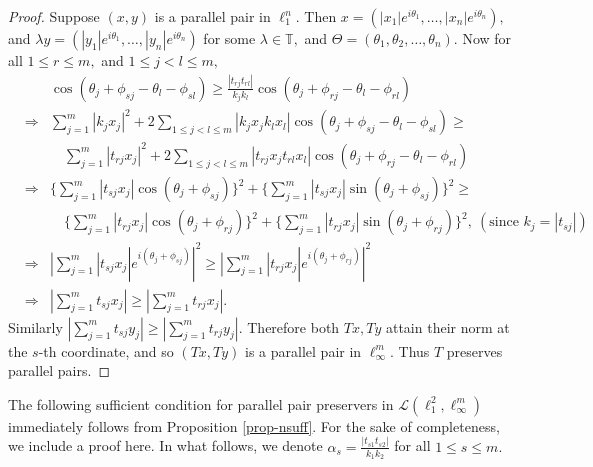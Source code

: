 \documentclass{amsart}
\theoremstyle{definition}
\newtheorem{cor}[theorem]{Corollary}
\theoremstyle{remark}
\numberwithin{equation}{section}
\begin{document}
\begin{proof}
	Suppose $(x,y)$ is a parallel pair in $\ell_1^n.$ Then $x=(|x_1|e^{i\theta_1},\ldots, |x_n|e^{i\theta_n}),$ and $\lambda y=(|y_1|e^{i\theta_1},\ldots, |y_n|e^{i\theta_n})$ for some $\lambda\in \mathbb{T},$ and $\Theta=(\theta_1,\theta_2,\ldots,\theta_n).$  Now for all $1\leq r\leq m,$ and $1\leq j<l\leq m,$ 
	\begin{eqnarray*}
	&&	\cos(\theta_j+\phi_{sj}-\theta_l-\phi_{sl})\geq \frac{|t_{rj}t_{rl}|}{k_jk_l}\cos(\theta_j+\phi_{rj}-\theta_l-\phi_{rl})\\
	&\Rightarrow& 	\sum_{j=1}^m |k_jx_j|^2+2\sum_{1\leq j<l\leq m}|k_jx_jk_lx_l|\cos(\theta_j+\phi_{sj}-\theta_l-\phi_{sl})\geq \\
	&&	\quad \sum_{j=1}^m |t_{rj}x_j|^2+2\sum_{1\leq j<l\leq m}|t_{rj}x_jt_{rl}x_l|\cos(\theta_j+\phi_{rj}-\theta_l-\phi_{rl})\\
	&\Rightarrow& 		\Big\{\sum_{j=1}^m |t_{sj}x_j|\cos(\theta_j+\phi_{sj})\Big\}^2+	\Big\{\sum_{j=1}^m |t_{sj}x_j|\sin(\theta_j+\phi_{sj})\Big\}^2\geq \\
	&&	\quad 	\Big\{\sum_{j=1}^m |t_{rj}x_j|\cos(\theta_j+\phi_{rj})\Big\}^2+	\Big\{\sum_{j=1}^m |t_{rj}x_j|\sin(\theta_j+\phi_{rj})\Big\}^2, ~(\text{since } k_j=|t_{sj}|)\\
			&\Rightarrow& 		|\sum_{j=1}^m |t_{sj}x_j|e^{i(\theta_j+\phi_{sj})}|^2\geq 	|\sum_{j=1}^m |t_{rj}x_j|e^{i(\theta_j+\phi_{rj})}|^2\\
		&\Rightarrow& 		|\sum_{j=1}^m t_{sj}x_j|\geq 	|\sum_{j=1}^m t_{rj}x_j| . %
	\end{eqnarray*}
	Similarly $	|\sum_{j=1}^m t_{sj}y_j|\geq 	|\sum_{j=1}^m t_{rj}y_j|. $ Therefore both $Tx,Ty$ attain their norm at the $s$-th coordinate, and so $(Tx,Ty)$ is a parallel pair in $\ell_\infty^m.$ Thus $T$ preserves parallel pairs.
\end{proof}
 The following sufficient condition for parallel pair preservers in $\mathcal{L}(\ell_1^2,\ell_\infty^m)$ immediately follows from Proposition \ref{prop-nsuff}.  For the sake of completeness, we include a proof here.   In what follows, we denote  $\alpha_s=\frac{|t_{s1}t_{s2}|}{k_1k_2}$ for all  $1\leq s\leq m.$
\end{document}
